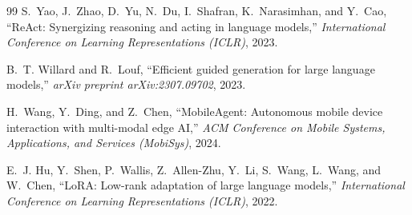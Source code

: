 \documentclass[12pt,a4paper,oneside]{report}
\begin{document}
\begin{thebibliography}{99}
S.~Yao, J.~Zhao, D.~Yu, N.~Du, I.~Shafran, K.~Narasimhan, and Y.~Cao,
``ReAct: Synergizing reasoning and acting in language models,''
\emph{International Conference on Learning Representations (ICLR)}, 2023.

B.~T. Willard and R.~Louf,
``Efficient guided generation for large language models,''
\emph{arXiv preprint arXiv:2307.09702}, 2023.

H.~Wang, Y.~Ding, and Z.~Chen,
``MobileAgent: Autonomous mobile device interaction with multi-modal edge AI,''
\emph{ACM Conference on Mobile Systems, Applications, and Services (MobiSys)}, 2024.

E.~J. Hu, Y.~Shen, P.~Wallis, Z.~Allen-Zhu, Y.~Li, S.~Wang, L.~Wang, and W.~Chen,
``LoRA: Low-rank adaptation of large language models,''
\emph{International Conference on Learning Representations (ICLR)}, 2022.

\end{thebibliography}
\end{document}
